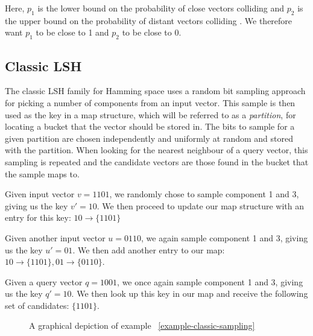 Here, $p_1$ is the lower bound on the probability of close vectors colliding and $p_2$ is the upper bound on the probability of distant vectors colliding \cite[p. 100]{DBLP:books/cu/LeskovecRU14}. We therefore want $p_1$ to be close to 1 and $p_2$ to be close to 0.

\subsection{Classic LSH}
\label{background-classic-lsh}

The classic LSH family for Hamming space uses a random bit sampling approach for picking a number of components from an input vector. This sample is then used as the key in a map structure, which will be referred to as a \textit{partition}, for locating a bucket that the vector should be stored in. The bits to sample for a given partition are chosen independently and uniformly at random and stored with the partition. When looking for the nearest neighbour of a query vector, this sampling is repeated and the candidate vectors are those found in the bucket that the sample maps to.

\begin{example}
\label{example-classic-sampling}
  Given input vector $v = 1101$, we randomly chose to sample component 1 and 3, giving us the key $v' = 10$. We then proceed to update our map structure with an entry for this key: $10 \rightarrow \{1101\}$

  Given another input vector $u = 0110$, we again sample component 1 and 3, giving us the key $u' = 01$. We then add another entry to our map: $10 \rightarrow \{1101\}, 01 \rightarrow \{0110\}$.

  Given a query vector $q = 1001$, we once again sample component 1 and 3, giving us the key $q' = 10$. We then look up this key in our map and receive the following set of candidates: $\{1101\}$.
\end{example}

\begin{figure}[ht]
  \centering

  \caption{A graphical depiction of example ~\ref{example-classic-sampling}}
  \label{figure-classic-sampling}
\end{figure}

